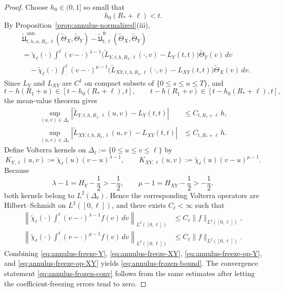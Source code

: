 \documentclass[11pt,a4paper]{amsart}
\theoremstyle{plain}
\theoremstyle{definition}
\theoremstyle{remark}
\begin{document}
\begin{proof}
Choose \(h_0\in(0,1]\) so small that
\[
h_0(R_*+\ell)<t.
\]
By Proposition~\ref{prop:annulus-normalized}(iii),
\begin{align*}
&\widetilde{\mathfrak U}_{t,h,\alpha,R_1,\ell}^{\mathrm{ann}}
(\widetilde\Theta_X,\widetilde\Theta_Y)
-
\widetilde{\mathfrak U}_{t,\ell}^{\mathrm{fr}}
(\widetilde\Theta_X,\widetilde\Theta_Y)\\
&=
\widetilde\chi_\ell(\cdot)
\int_{\cdot}^{\ell}
(v-\cdot)^{\lambda-1}
\bigl(
\widetilde L_{Y,t,h,R_1,\ell}(\cdot,v)-L_Y(t,t)
\bigr)\widetilde\Theta_Y(v)\,dv\\
&\quad-
\widetilde\chi_\ell(\cdot)
\int_{\cdot}^{\ell}
(v-\cdot)^{\mu-1}
\bigl(
\widetilde L_{XY,t,h,R_1,\ell}(\cdot,v)-L_{XY}(t,t)
\bigr)\widetilde\Theta_X(v)\,dv.
\end{align*}
Since \(L_Y\) and \(L_{XY}\) are \(C^1\) on compact subsets of \(\{0\le s\le u\le T\}\), and
\[
t-h(R_1+u)\in [t-h_0(R_*+\ell),t],
\qquad
t-h(R_1+v)\in [t-h_0(R_*+\ell),t],
\]
the mean-value theorem gives
\begin{align}
\sup_{(u,v)\in\Delta_\ell}
\left|
\widetilde L_{Y,t,h,R_1,\ell}(u,v)-L_Y(t,t)
\right|
&\le
C_{t,R_*+\ell}\,h,
\label{eq:annulus-freeze-Y}\\
\sup_{(u,v)\in\Delta_\ell}
\left|
\widetilde L_{XY,t,h,R_1,\ell}(u,v)-L_{XY}(t,t)
\right|
&\le
C_{t,R_*+\ell}\,h.
\label{eq:annulus-freeze-XY}
\end{align}
Define Volterra kernels on \(\Delta_\ell:=\{0\le u\le v\le \ell\}\) by
\[
K_{Y,\ell}(u,v):=\widetilde\chi_\ell(u)(v-u)^{\lambda-1},
\qquad
K_{XY,\ell}(u,v):=\widetilde\chi_\ell(u)(v-u)^{\mu-1}.
\]
Because
\[
\lambda-1=H_Y-\frac12>-\frac12,
\qquad
\mu-1=H_{XY}-\frac12>-\frac12,
\]
both kernels belong to \(L^2(\Delta_\ell)\). Hence the corresponding Volterra operators are
Hilbert--Schmidt on \(L^2([0,\ell])\), and there exists \(C_\ell<\infty\) such that
\begin{align}
\left\|
\widetilde\chi_\ell(\cdot)
\int_{\cdot}^{\ell}
(v-\cdot)^{\lambda-1}f(v)\,dv
\right\|_{L^2([0,\ell])}
&\le
C_\ell\|f\|_{L^2([0,\ell])},
\label{eq:annulus-freeze-op-Y}\\
\left\|
\widetilde\chi_\ell(\cdot)
\int_{\cdot}^{\ell}
(v-\cdot)^{\mu-1}f(v)\,dv
\right\|_{L^2([0,\ell])}
&\le
C_\ell\|f\|_{L^2([0,\ell])}.
\label{eq:annulus-freeze-op-XY}
\end{align}
Combining \eqref{eq:annulus-freeze-Y}, \eqref{eq:annulus-freeze-XY},
\eqref{eq:annulus-freeze-op-Y}, and \eqref{eq:annulus-freeze-op-XY} yields
\eqref{eq:annulus-frozen-bound}. The convergence statement \eqref{eq:annulus-frozen-conv} follows
from the same estimates after letting the coefficient-freezing errors tend to zero.
\end{proof}
\end{document}
